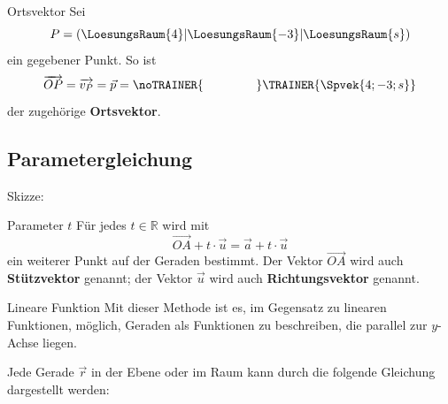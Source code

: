 \begin{beispiel}{Ortsvektor}{}
  Sei
  $$P=(\LoesungsRaum{4}|\LoesungsRaum{-3}|\LoesungsRaum{s})$$
  ein
gegebener Punkt. So ist
 $$\overrightarrow{OP} = \overrightarrow{v_P} = \vec{p} = \noTRAINER{\hspace{15mm}} \TRAINER{\Spvek{4;-3;s}}$$
der zugehörige \textbf{Ortsvektor}.
\end{beispiel}


\newpage
\subsection{Parametergleichung}

Skizze:


\begin{bemerkung}{Parameter $t$}{}
  Für jedes $t\in\mathbb{R}$ wird mit
  $$\overrightarrow{OA} + t\cdot{} \vec{u} = \vec{a} + t\cdot{} \vec{u}$$
  ein weiterer Punkt auf der Geraden bestimmt. Der Vektor $\overrightarrow{OA}$ wird
  auch \textbf{Stützvektor} genannt; der Vektor $\vec{u}$ wird auch \textbf{Richtungsvektor} genannt.
\end{bemerkung}

\begin{bemerkung}{Lineare Funktion}{}
  Mit dieser Methode ist es, im Gegensatz zu linearen Funktionen, möglich, Geraden als Funktionen zu beschreiben, die parallel zur $y$-Achse liegen.
  \end{bemerkung}
\newpage

Jede Gerade $\vec{r}$ in der Ebene oder im Raum kann durch die
folgende Gleichung dargestellt werden:

